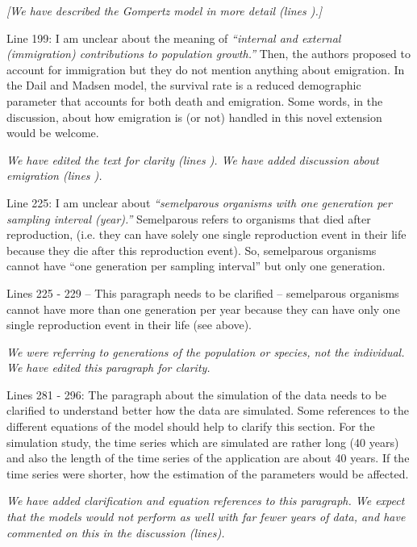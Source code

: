 \documentclass[12pt,english]{article}
\begin{document}
\begin{spacing}{1.9}
\begin{flushleft}
\vspace{0.5cm}
\textit{[We have described the Gompertz model in more 
detail (lines ).]}

\vspace{0.5cm}

Line 199: I am unclear about the meaning of \textit{``internal and external (immigration)
contributions to population growth.''} Then, the authors proposed to account for immigration
but they do not mention anything about emigration. In the Dail and Madsen model, the
survival rate is a reduced demographic parameter that accounts for both death and
emigration. Some words, in the discussion, about how emigration is (or not) handled in this
novel extension would be welcome.

\vspace{0.5cm}
\textit{We have edited the text for clarity (lines ).  We have added discussion about emigration
(lines ).}
\vspace{0.5cm}

Line 225: I am unclear about \textit{``semelparous organisms with one generation per sampling
interval (year).''} Semelparous refers to organisms that died after reproduction, (i.e. they can
have solely one single reproduction event in their life because they die after this
reproduction event). So, semelparous organisms cannot have ``one generation per sampling
interval'' but only one generation.

Lines 225 - 229 – This paragraph needs to be clarified – semelparous organisms cannot have
more than one generation per year because they can have only one single reproduction
event in their life (see above).

\vspace{0.5cm}
\textit{We were referring to generations of the population or species, not the individual.  We have edited 
this paragraph for clarity.}
\vspace{0.5cm}

Lines 281 - 296: The paragraph about the simulation of the data needs to be clarified to
understand better how the data are simulated. Some references to the different equations
of the model should help to clarify this section. For the simulation study, the time series
which are simulated are rather long (40 years) and also the length of the time series of the
application are about 40 years. If the time series were shorter, how the estimation of the
parameters would be affected.

\vspace{0.5cm}
\textit{We have added clarification and equation references to this paragraph. We expect that
the models would not perform as well with far fewer years of data, and have commented on
this in the discussion (lines).}
\vspace{0.5cm}


\end{flushleft}
\end{spacing}
\end{document}
